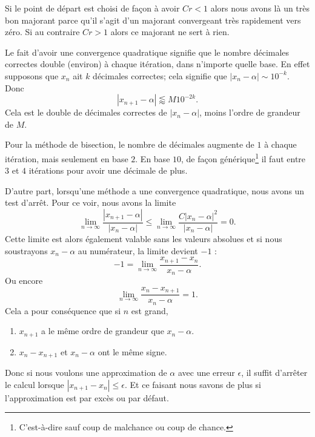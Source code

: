 Si le point de départ est choisi de façon à avoir \( Cr<1\) alors nous avons là un très bon majorant parce qu'il s'agit d'un majorant convergeant très rapidement vers zéro. Si au contraire \( Cr>1\) alors ce majorant ne sert à rien.

\begin{normaltext}
	Le fait d'avoir une convergence quadratique signifie que le nombre décimales correctes double (environ) à chaque itération, dans n'importe quelle base. En effet supposons que \( x_n\) ait \( k\) décimales correctes; cela signifie que \( | x_n-\alpha |\sim 10^{-k}\). Donc
	\begin{equation}
		| x_{n+1}-\alpha |\lessapprox M 10^{-2k}.
	\end{equation}
	Cela est le double de décimales correctes de \( | x_n-\alpha |\), moins l'ordre de grandeur de \( M\).

	Pour la méthode de bisection, le nombre de décimales augmente de \( 1\) à chaque itération, mais seulement en base \( 2\). En base \( 10\), de façon générique\footnote{C'est-à-dire sauf coup de malchance ou coup de chance.} il faut entre \( 3\) et \( 4\) itérations pour avoir une décimale de plus.
\end{normaltext}

\begin{normaltext}       \label{NTooVXLXooXlAGEq}
	D'autre part, lorsqu'une méthode a une convergence quadratique, nous avons un test d'arrêt. Pour ce voir, nous avons la limite
	\begin{equation}
		\lim_{n\to \infty} \frac{ | x_{n+1}-\alpha | }{ | x_n-\alpha | }\leq\lim_{n\to \infty} \frac{ C| x_n-\alpha |^2 }{ | x_n-\alpha | }=0.
	\end{equation}
	Cette limite est alors également valable sans les valeurs absolues et si nous soustrayons \( x_n-\alpha\) au numérateur, la limite devient \( -1\) :
	\begin{equation}
		-1=\lim_{n\to \infty} \frac{ x_{n+1}-x_n }{ x_n-\alpha }.
	\end{equation}
	Ou encore
	\begin{equation}
		\lim_{n\to \infty} \frac{ x_n-x_{n+1} }{ x_n-\alpha }=1.
	\end{equation}
	Cela a pour conséquence que si \( n\) est grand,
	\begin{enumerate}
		\item
		      \( x_{n+1}\) a le même ordre de grandeur que \( x_n-\alpha\).
		\item
		      \( x_n-x_{n+1}\) et \( x_n-\alpha\) ont le même signe.
	\end{enumerate}
	Donc si nous voulons une approximation de \( \alpha\) avec une erreur \( \epsilon\), il suffit d'arrêter le calcul lorsque \( | x_{n+1}-x_n |\leq \epsilon\). Et ce faisant nous savons de plus si l'approximation est par excès ou par défaut.
\end{normaltext}

